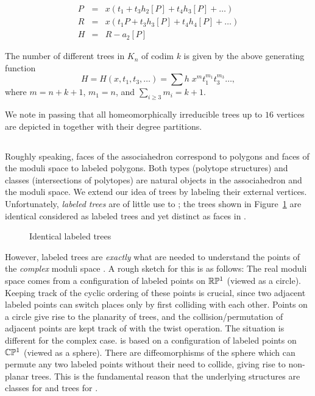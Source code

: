 \documentclass[10pt]{amsart}
\begin{document}
    \begin{eqnarray*}
        P &=& x(t_1 + t_3 h_2[P] + t_4 h_3[P] + \ldots ) \\
        R &=& x(t_1 P + t_3 h_3[P] + t_4 h_4[P] + \ldots )\\
        H &=& R - a_2[P]
        \end{eqnarray*}
        
        \begin{thm}
        The number of different trees in $K_n$ of codim $k$ is given by the above generating function
        $$H = H(x, t_1, t_3, \ldots) = \sum h \; x^m t_1^{m_1} t_3^{m_3} \ldots,$$ where $m=n+k+1$, $m_1=n$, and $\displaystyle{\sum_{i \geq 3} m_i = k+1}$.
        \end{thm}
        
        \noindent We note in passing that all homeomorphically irreducible trees up to $16$ vertices are depicted in \cite{rw} together with their degree partitions.
        
        
        \subsection{}
        Roughly speaking, faces of the associahedron correspond to polygons and faces of the moduli space to labeled polygons. Both types (polytope structures) and classes (intersections of polytopes) are natural objects in the associahedron and the moduli space.  We extend our idea of trees by labeling their external vertices.  Unfortunately, {\em labeled trees} are of little use to ; the trees shown in Figure~\ref{phylolabel} are identical considered as labeled trees and yet distinct as faces in .
         
        \begin{figure}[h]
        \caption{Identical labeled trees}
        \label{phylolabel}
        \end{figure}
        
        However, labeled trees are {\em exactly} what are needed to understand the points of the {\em complex} moduli space .  A rough sketch for this is as follows: The real moduli space  comes from a configuration of labeled points on ${\mathbb R} {\mathbb P}^1$ (viewed as a circle).  Keeping track of the cyclic ordering of these points is crucial, since two adjacent labeled points can switch places only by  first colliding with each other.  Points on a circle give rise to the planarity of trees, and the collision/permutation of adjacent points are kept track of with the twist operation. The situation is different for the complex case.   is based on a configuration of labeled points on ${\mathbb C} {\mathbb P}^1$ (viewed as a sphere).  There are diffeomorphisms of the sphere which can permute any two labeled points without their need to collide, giving rise to non-planar trees. This is the fundamental reason that the underlying structures are classes for  and trees for .
        
\end{document}
